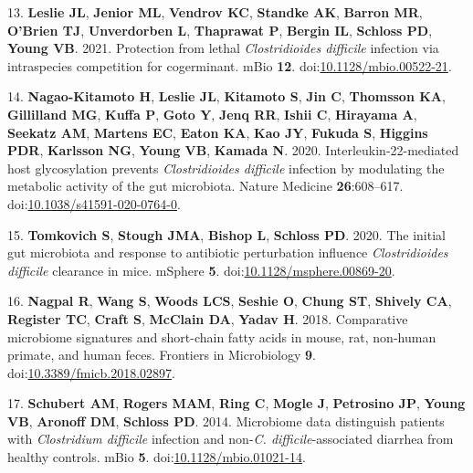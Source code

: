 \documentclass[
  12pt,
]{article}
\newenvironment{cslreferences}%
  {}%
  {\par}
\begin{document}
\begin{cslreferences}
\leavevmode\hypertarget{ref-Leslie2021}{}%
13. \textbf{Leslie JL}, \textbf{Jenior ML}, \textbf{Vendrov KC},
\textbf{Standke AK}, \textbf{Barron MR}, \textbf{O'Brien TJ},
\textbf{Unverdorben L}, \textbf{Thaprawat P}, \textbf{Bergin IL},
\textbf{Schloss PD}, \textbf{Young VB}. 2021. Protection from lethal
\emph{Clostridioides difficile} infection via intraspecies competition
for cogerminant. mBio \textbf{12}.
doi:\href{https://doi.org/10.1128/mbio.00522-21}{10.1128/mbio.00522-21}.

\leavevmode\hypertarget{ref-NagaoKitamoto2020}{}%
14. \textbf{Nagao-Kitamoto H}, \textbf{Leslie JL}, \textbf{Kitamoto S},
\textbf{Jin C}, \textbf{Thomsson KA}, \textbf{Gillilland MG},
\textbf{Kuffa P}, \textbf{Goto Y}, \textbf{Jenq RR}, \textbf{Ishii C},
\textbf{Hirayama A}, \textbf{Seekatz AM}, \textbf{Martens EC},
\textbf{Eaton KA}, \textbf{Kao JY}, \textbf{Fukuda S}, \textbf{Higgins
PDR}, \textbf{Karlsson NG}, \textbf{Young VB}, \textbf{Kamada N}. 2020.
Interleukin-22-mediated host glycosylation prevents \emph{Clostridioides
difficile} infection by modulating the metabolic activity of the gut
microbiota. Nature Medicine \textbf{26}:608--617.
doi:\href{https://doi.org/10.1038/s41591-020-0764-0}{10.1038/s41591-020-0764-0}.

\leavevmode\hypertarget{ref-Tomkovich2020}{}%
15. \textbf{Tomkovich S}, \textbf{Stough JMA}, \textbf{Bishop L},
\textbf{Schloss PD}. 2020. The initial gut microbiota and response to
antibiotic perturbation influence \emph{Clostridioides difficile}
clearance in mice. mSphere \textbf{5}.
doi:\href{https://doi.org/10.1128/msphere.00869-20}{10.1128/msphere.00869-20}.

\leavevmode\hypertarget{ref-Nagpal2018}{}%
16. \textbf{Nagpal R}, \textbf{Wang S}, \textbf{Woods LCS},
\textbf{Seshie O}, \textbf{Chung ST}, \textbf{Shively CA},
\textbf{Register TC}, \textbf{Craft S}, \textbf{McClain DA},
\textbf{Yadav H}. 2018. Comparative microbiome signatures and
short-chain fatty acids in mouse, rat, non-human primate, and human
feces. Frontiers in Microbiology \textbf{9}.
doi:\href{https://doi.org/10.3389/fmicb.2018.02897}{10.3389/fmicb.2018.02897}.

\leavevmode\hypertarget{ref-Schubert2014}{}%
17. \textbf{Schubert AM}, \textbf{Rogers MAM}, \textbf{Ring C},
\textbf{Mogle J}, \textbf{Petrosino JP}, \textbf{Young VB},
\textbf{Aronoff DM}, \textbf{Schloss PD}. 2014. Microbiome data
distinguish patients with \emph{Clostridium difficile} infection and
non-\emph{C. difficile}-associated diarrhea from healthy controls. mBio
\textbf{5}.
doi:\href{https://doi.org/10.1128/mbio.01021-14}{10.1128/mbio.01021-14}.


\end{cslreferences}
\end{document}

